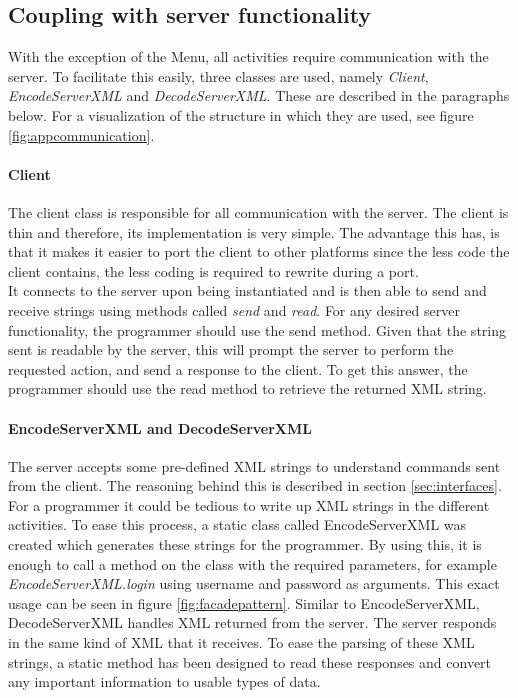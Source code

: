 \subsection{Coupling with server functionality}
\label{subsec:server-coupling}
With the exception of the Menu, all activities require communication with the server. To facilitate this easily, three classes are used, namely \textit{Client}, \textit{EncodeServerXML} and \textit{DecodeServerXML}. These are described in the paragraphs below. For a visualization of the structure in which they are used, see figure \ref{fig:appcommunication}.

\paragraph{Client}
The client class is responsible for all communication with the server. The client is thin and therefore, its implementation is very simple. The advantage this has, is that it makes it easier to port the client to other platforms since the less code the client contains, the less coding is required to rewrite during a port.\\

It connects to the server upon being instantiated and is then able to send and receive strings using methods called \textit{send} and \textit{read}. For any desired server functionality, the programmer should use the send method. Given that the string sent is readable by the server, this will prompt the server to perform the requested action, and send a response to the client. To get this answer, the programmer should use the read method to retrieve the returned XML string.

\paragraph{EncodeServerXML and DecodeServerXML}
The server accepts some pre-defined XML strings to understand commands sent from the client. The reasoning behind this is described in section \ref{sec:interfaces}. For a programmer it could be tedious to write up XML strings in the different activities. To ease this process, a static class called EncodeServerXML was created which generates these strings for the programmer. By using this, it is enough to call a method on the class with the required parameters, for example \textit{EncodeServerXML.login} using username and password as arguments. This exact usage can be seen in figure \ref{fig:facadepattern}. Similar to EncodeServerXML, DecodeServerXML handles XML returned from the server. The server responds in the same kind of XML that it receives. To ease the parsing of these XML strings, a static method has been designed to read these responses and convert any important information to usable types of data.

